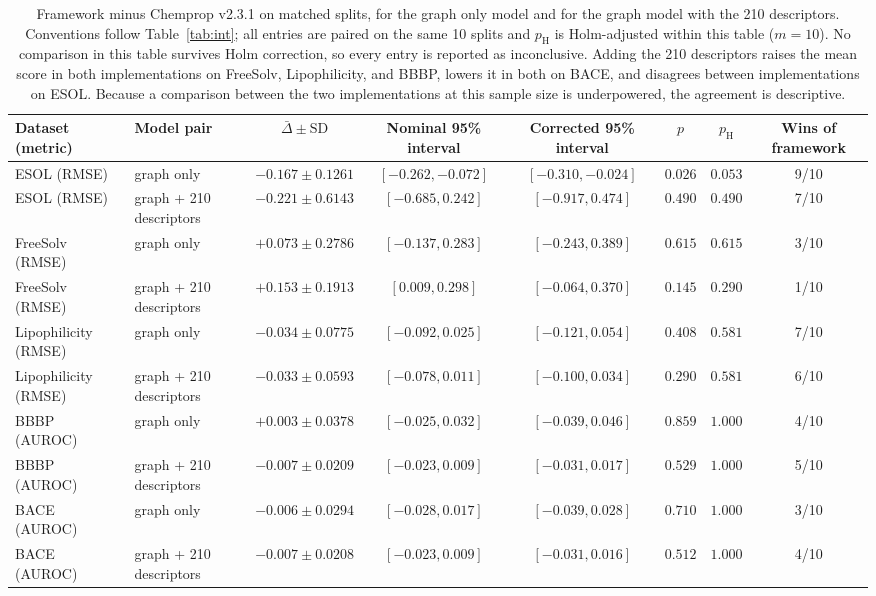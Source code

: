 \begin{table}[H]
\caption{Framework minus Chemprop v2.3.1 on matched splits, for the graph only model and for the graph model with the 210 descriptors. Conventions follow Table~\ref{tab:int}; all entries are paired on the same 10 splits and $p_{\mathrm{H}}$ is Holm-adjusted within this table ($m=10$). No comparison in this table survives Holm correction, so every entry is reported as inconclusive. Adding the 210 descriptors raises the mean score in both implementations on FreeSolv, Lipophilicity, and BBBP, lowers it in both on BACE, and disagrees between implementations on ESOL. Because a comparison between the two implementations at this sample size is underpowered, the agreement is descriptive.}\label{tab:ext}
\centering\scriptsize
\setlength{\tabcolsep}{4pt}
\begin{tabular}{@{}llcccccc@{}}
\toprule
Dataset (metric) & Model pair & $\bar\Delta\pm\mathrm{SD}$ & Nominal 95\% interval & Corrected 95\% interval & $p$ & $p_{\mathrm{H}}$ & Wins of framework \\
\midrule
ESOL (RMSE) & graph only & $-0.167\pm0.1261$ & $[-0.262,-0.072]$ & $[-0.310,-0.024]$ & $0.026$ & $0.053$ & 9/10 \\
ESOL (RMSE) & graph + 210 descriptors & $-0.221\pm0.6143$ & $[-0.685,0.242]$ & $[-0.917,0.474]$ & $0.490$ & $0.490$ & 7/10 \\
FreeSolv (RMSE) & graph only & $+0.073\pm0.2786$ & $[-0.137,0.283]$ & $[-0.243,0.389]$ & $0.615$ & $0.615$ & 3/10 \\
FreeSolv (RMSE) & graph + 210 descriptors & $+0.153\pm0.1913$ & $[0.009,0.298]$ & $[-0.064,0.370]$ & $0.145$ & $0.290$ & 1/10 \\
Lipophilicity (RMSE) & graph only & $-0.034\pm0.0775$ & $[-0.092,0.025]$ & $[-0.121,0.054]$ & $0.408$ & $0.581$ & 7/10 \\
Lipophilicity (RMSE) & graph + 210 descriptors & $-0.033\pm0.0593$ & $[-0.078,0.011]$ & $[-0.100,0.034]$ & $0.290$ & $0.581$ & 6/10 \\
BBBP (AUROC) & graph only & $+0.003\pm0.0378$ & $[-0.025,0.032]$ & $[-0.039,0.046]$ & $0.859$ & $1.000$ & 4/10 \\
BBBP (AUROC) & graph + 210 descriptors & $-0.007\pm0.0209$ & $[-0.023,0.009]$ & $[-0.031,0.017]$ & $0.529$ & $1.000$ & 5/10 \\
BACE (AUROC) & graph only & $-0.006\pm0.0294$ & $[-0.028,0.017]$ & $[-0.039,0.028]$ & $0.710$ & $1.000$ & 3/10 \\
BACE (AUROC) & graph + 210 descriptors & $-0.007\pm0.0208$ & $[-0.023,0.009]$ & $[-0.031,0.016]$ & $0.512$ & $1.000$ & 4/10 \\
\bottomrule
\end{tabular}
\end{table}
